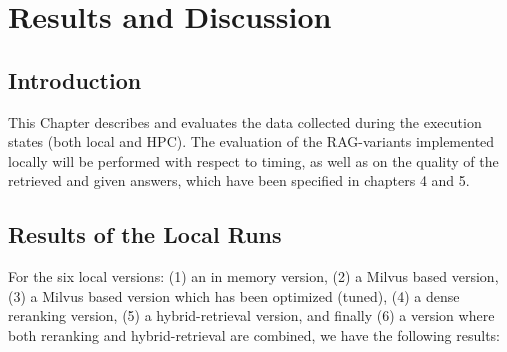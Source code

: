 \chapter{Results and Discussion}

\section{Introduction}
This Chapter describes and evaluates the data collected during the execution states (both local and HPC). The evaluation of the RAG-variants implemented locally will be performed with respect to timing, as well as on the quality of the retrieved and given answers, which have been specified in chapters 4 and 5. 


\section{Results of the Local Runs }
For the six local versions: (1) an in memory version, (2) a Milvus based version, (3) a Milvus based version which has been optimized (tuned), (4) a dense reranking version, (5) a hybrid-retrieval version, and finally (6) a version where both reranking and hybrid-retrieval are combined, we have the following results:

\begin{table}[htbp]
    \centering
    \caption{Summary of local evaluation results averaged across the five scenarios.}
    \label{tab:local-results-summary}
\end{table}

